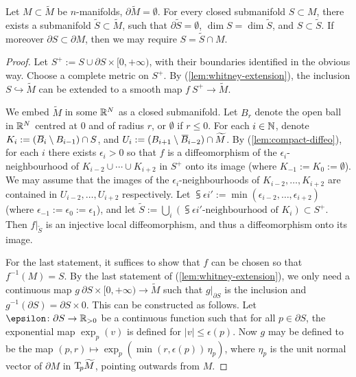 \begin{lemma}\label{lem:extension}
Let $M\subset\widetilde M$ be $n$-manifolds,
$\partial\widetilde M=\emptyset$.
For every closed submanifold $S\subset M$,
there exists a submanifold $\widetilde S\subset\widetilde M$,
such that $\partial\widetilde S=\emptyset$,
$\dim S=\dim\widetilde S$, and $S\subset\widetilde S$.
If moreover $\partial S\subset\partial M$,
then we may require $S=\widetilde S\cap M$.
\end{lemma}

\begin{proof}
Let $S^+:=S\cup\partial S\times[0,+\infty)$, with their boundaries identified in the obvious way.
Choose a complete metric on $S^+$.
By (\ref{lem:whitney-extension}), the inclusion $S\hookrightarrow\widetilde M$
can be extended to a smooth map $f\:S^+\to\widetilde M$.

We embed $\widetilde M$ in some $\mathbb{R}^N$ as a closed submanifold. 
Let $B_r$ denote the open ball in $\mathbb{R}^N$ centred at $0$ and of radius $r$, or $\emptyset$ if $r\leq0$.
For each $i\in\mathbb{N}$, denote $K_i:=(\oline2B_i\setminus B_{i-1})\cap S$,
and $U_i:=(B_{i+1}\setminus \oline2B_{i-2})\cap\widetilde M$.
By (\ref{lem:compact-diffeo}), for each $i$ there exists $\epsilon_i>0$
so that $f$ is a diffeomorphism of the
$\epsilon_i$-neighbourhood of $K_{i-2}\cup\cdots\cup K_{i+2}$ in $S^+$ onto its image
(where $K_{-1}:=K_0:=\emptyset$).
We may assume that the images of the $\epsilon_i$-neighbourhoods of $K_{i-2},\dotsc,K_{i+2}$
are contained in $U_{i-2},\dotsc,U_{i+2}$ respectively.
Let $\subsup\epsilon i\prime:=\min(\epsilon_{i-2},\dotsc,\epsilon_{i+2})$
(where $\epsilon_{-1}:=\epsilon_0:=\epsilon_1$),
and let $\widetilde S:=\bigcup_i(\text{$\subsup\epsilon i\prime$-neighbourhood of $K_i$})\subset S^+$.
Then $f|_{\widetilde S}$ is an injective local diffeomorphism,
and thus a diffeomorphism onto its image.

For the last statement, it suffices to show that $f$ can be chosen so that $f^{-1}(M)=S$.
By the last statement of (\ref{lem:whitney-extension}),
we only need a continuous map $g\:\partial S\times[0,+\infty)\to\widetilde M$
such that $g|_{\partial S}$ is the inclusion and $g^{-1}(\partial S)=\partial S\times0$.
This can be constructed as follows.
Let $\epsilon\:\partial S\to\R_{>0}$ be a continuous function
such that for all $p\in\partial S$,
the exponential map $\exp_p(v)$ is defined for $|v|\leq\epsilon(p)$.
Now $g$ may be defined to be the map $(p,r)\mapsto\exp_p(\min(r,\epsilon(p))\,\eta_p)$,
where $\eta_p$ is the unit normal vector of $\partial M$ in $\mathrm{T}\!_p\widetilde M$,
pointing outwards from $M$.
\end{proof}

